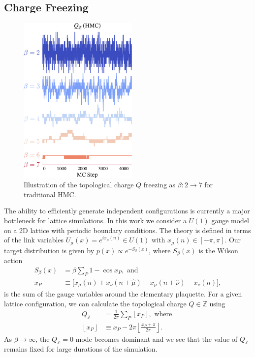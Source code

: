 \documentclass[a4paper,11pt]{article}
\begin{document}
\subsection{\label{subsec:qfreezing}Charge Freezing}
%
\begin{figure}
    \vspace{-\baselineskip}
    \centering
    \includegraphics[width=0.52\textwidth]{assets/qfreezing.pdf}
    \caption{\label{fig:qfreezing}Illustration of the topological charge \(Q\)
    freezing as \(\beta : 2 \rightarrow 7\) for traditional HMC.}
\end{figure}
%
The ability to efficiently generate independent configurations is currently
a major bottleneck for lattice simulations.
%
In this work we consider a \(U(1)\) gauge model on a 2D lattice with periodic
boundary conditions.
%
The theory is defined in terms of the link variables \(U_{\mu}(x) = e^{i
x_{\mu}(n)} \in U(1)\) with \(x_{\mu}(n) \in [-\pi, \pi]\).
%
Our target distribution is given by \(p(x)\propto e^{-S_{\beta}(x)}\), where
\(S_{\beta}(x)\) is the Wilson action
%
\begin{align}
    S_{\beta}(x) &= \beta \sum_{P} 1 - \cos{x_{P}}, \text{    and}\\
    x_{P} &\equiv \big[x_{\mu}(n) + x_{\nu}(n + \hat{\mu})\nonumber
      - x_{\mu}(n+\hat{\nu}) - x_{\nu}(n)\big],
\end{align}
%
is the sum of the gauge variables around the elementary plaquette.
%
For a given lattice configuration, we can calculate the topological charge \(Q
\in \mathbb{Z}\) using
%
\begin{align*}
    Q_{\mathbb{Z}} &= \frac{1}{2\pi}\sum_{P}\left\lfloor x_{P} \right\rfloor,\text{ where } \\
    \left\lfloor x_{P} \right\rfloor &\equiv x_{P} - 2\pi
    \left\lfloor\frac{x_{P}+\pi}{2\pi}\right\rfloor.
\end{align*}
%
As \(\beta \rightarrow \infty\), the \(Q_{\mathbb{Z}} = 0\) mode becomes
dominant and we see that the value of \(Q_\mathbb{Z}\) remains fixed for large
durations of the simulation.
%
\end{document}
